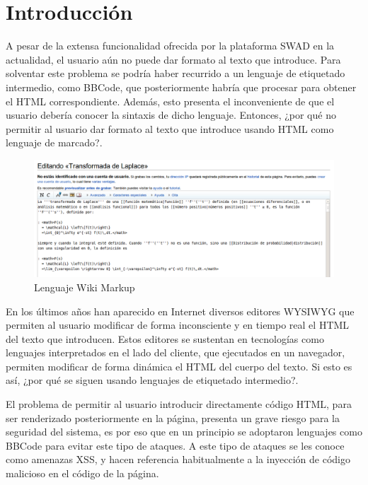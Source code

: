 \chapter{Introducción}

A pesar de la extensa funcionalidad ofrecida por la plataforma SWAD en la actualidad, el usuario aún no puede dar formato al texto que introduce. Para solventar este problema se podría haber recurrido a un lenguaje de etiquetado intermedio, como BBCode, que posteriormente habría que procesar para obtener el HTML correspondiente. Además, esto presenta el inconveniente de que el usuario debería conocer la sintaxis de dicho lenguaje. Entonces, ¿por qué no permitir al usuario dar formato al texto que introduce usando HTML como lenguaje de marcado?. 

\begin{figure}[h!]
  \centering
      \includegraphics[width=6in]{fig/wiki_markup}
  \caption{Lenguaje Wiki Markup}
  \label{fig:wiki_markup}

\end{figure}


En los últimos años han aparecido en Internet diversos editores WYSIWYG que permiten al usuario modificar de forma inconsciente y en tiempo real el HTML del texto que introducen. Estos editores se sustentan en tecnologías como lenguajes interpretados en el lado del cliente, que ejecutados en un navegador, permiten modificar de forma dinámica el HTML del cuerpo del texto. Si esto es así, ¿por qué se siguen usando lenguajes de etiquetado intermedio?. 

El problema de permitir al usuario introducir directamente código HTML, para ser renderizado posteriormente en la página, presenta un grave riesgo para la seguridad del sistema, es por eso que en un principio se adoptaron lenguajes como BBCode para evitar este tipo de ataques. A este tipo de ataques se les conoce como amenazas XSS, y hacen referencia habitualmente a la inyección de código malicioso en el código de la página.

